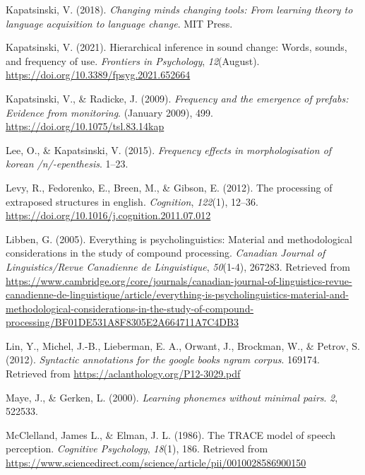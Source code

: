 \documentclass[
  man,floatsintext]{apa6}
\newlength{\cslhangindent}
\newenvironment{CSLReferences}[2] %
 {\begin{list}{}{%
  \setlength{\itemindent}{0pt}
  \setlength{\leftmargin}{0pt}
  \setlength{\parsep}{0pt}
  \ifodd #1
   \setlength{\leftmargin}{\cslhangindent}
   \setlength{\itemindent}{-1\cslhangindent}
  \fi
  \setlength{\itemsep}{#2\baselineskip}}}
 {\end{list}}
\begin{document}
\begin{CSLReferences}{1}{0}
Kapatsinski, V. (2018). \emph{Changing minds changing tools: From learning theory to language acquisition to language change}. MIT Press.

Kapatsinski, V. (2021). Hierarchical inference in sound change: Words, sounds, and frequency of use. \emph{Frontiers in Psychology}, \emph{12}(August). \url{https://doi.org/10.3389/fpsyg.2021.652664}

Kapatsinski, V., \& Radicke, J. (2009). \emph{Frequency and the emergence of prefabs: Evidence from monitoring}. (January 2009), 499. \url{https://doi.org/10.1075/tsl.83.14kap}

Lee, O., \& Kapatsinski, V. (2015). \emph{Frequency effects in morphologisation of korean /n/-epenthesis}. 1--23.

Levy, R., Fedorenko, E., Breen, M., \& Gibson, E. (2012). The processing of extraposed structures in english. \emph{Cognition}, \emph{122}(1), 12--36. \url{https://doi.org/10.1016/j.cognition.2011.07.012}

Libben, G. (2005). Everything is psycholinguistics: Material and methodological considerations in the study of compound processing. \emph{Canadian Journal of Linguistics/Revue Canadienne de Linguistique}, \emph{50}(1-4), 267283. Retrieved from \url{https://www.cambridge.org/core/journals/canadian-journal-of-linguistics-revue-canadienne-de-linguistique/article/everything-is-psycholinguistics-material-and-methodological-considerations-in-the-study-of-compound-processing/BF01DE531A8F8305E2A664711A7C4DB3}

Lin, Y., Michel, J.-B., Lieberman, E. A., Orwant, J., Brockman, W., \& Petrov, S. (2012). \emph{Syntactic annotations for the google books ngram corpus}. 169174. Retrieved from \url{https://aclanthology.org/P12-3029.pdf}

Maye, J., \& Gerken, L. (2000). \emph{Learning phonemes without minimal pairs}. \emph{2}, 522533.

McClelland, James L., \& Elman, J. L. (1986). The TRACE model of speech perception. \emph{Cognitive Psychology}, \emph{18}(1), 186. Retrieved from \url{https://www.sciencedirect.com/science/article/pii/0010028586900150}


\end{CSLReferences}
\end{document}
